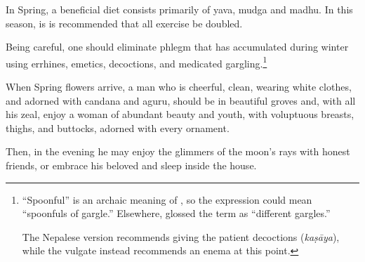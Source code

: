 \begin{translation}
\item[44] 
In Spring, a beneficial diet consists primarily of \gls{yava}, \gls{mudga} and \gls{madhu}. In this season, is is recommended
that all exercise be doubled.

\item[45] 
Being careful, one should eliminate phlegm that has accumulated during winter using errhines, %
emetics, decoctions, and medicated gargling.\footnote{``Spoonful'' is an archaic meaning of , so the expression  could mean ``spoonfuls of gargle.'' Elsewhere,  glossed the term as  ``different gargles.'' 

The Nepalese version recommends giving the patient decoctions (\emph{kaṣāya}), while the vulgate instead recommends an enema at this point.}  

\item[46--47] 

When Spring flowers arrive, %
a man who is cheerful, %
clean, %
wearing white clothes, 
and adorned with \gls{candana} and \gls{aguru}, 
should be in beautiful groves %
and, with all his zeal, %
enjoy a woman %
of abundant beauty and youth, with voluptuous breasts, thighs, and
buttocks, adorned with every ornament. 

\item[48] 
Then, in the evening %
he may enjoy %
the glimmers of the moon's rays %
with honest friends, %
or %
embrace his beloved and sleep inside the house. %


\end{translation}
